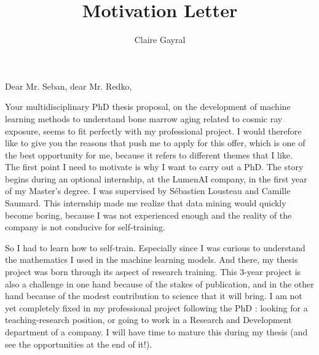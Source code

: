 \documentclass[a4paper,12pt]{article}
\title{Motivation Letter}
\author{Claire Gayral}
\date{}
\begin{document}
\maketitle

Dear Mr. Seban, dear Mr. Redko,

Your multidisciplinary PhD thesis proposal, on the development of machine learning methods to understand bone marrow aging related to cosmic ray exposure, seems to fit perfectly with my professional project. I would therefore like to give you the reasons that push me to apply for this offer, which is one of the best opportunity for me, because it refers to different themes that I like. \\

The first point I need to motivate is why I want to carry out a PhD. The story begins during an optional internship, at the LumenAI company, in the first year of my Master's degree. I was supervised by Sébastien Lousteau and Camille Saumard. This internship made me realize that data mining would quickly become boring, because I was not experienced enough and the reality of the company  is not conducive for self-training. 

So I had to learn how to self-train. Especially since I was curious to understand the mathematics I used in the machine learning models.
And there, my thesis project was born through its aspect of research training. 
This 3-year project is also a challenge in one hand because of the stakes of publication, and in the other hand because of the modest contribution to science that it will bring. I am not yet completely fixed in my professional project following the PhD : looking for a teaching-research position, or going to work in a Research and Development department of a company. I will have time to mature this during my thesis (and see the opportunities at the end of it!). 
\end{document}
